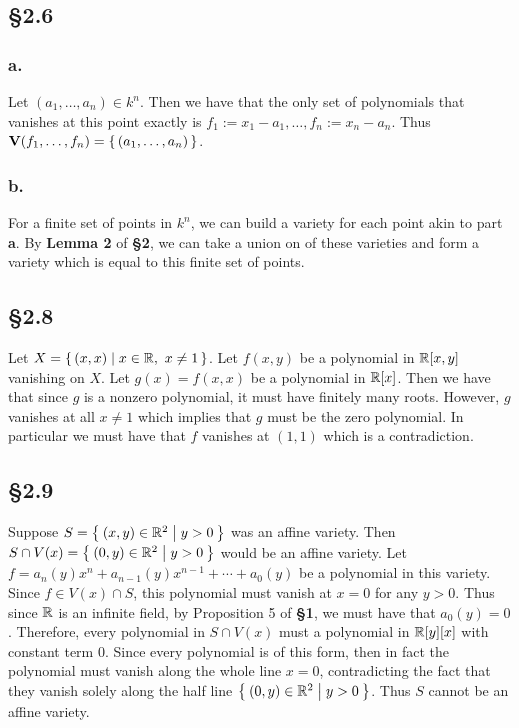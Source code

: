 \documentclass[letterpaper]{article}
\begin{document}
\subsection{\S 2.6}

\subsubsection{a.}

Let $(a_{1}, \ldots, a_{n}) \in k^{n}$. Then we have that the only set of polynomials that vanishes at this point exactly is $f_{1} := x_{1} - a_{1}, \ldots, f_{n} := x_{n} - a_{n}$. Thus $\textbf{V}(f_{1}, \ldots, f_{n}) = \set{(a_{1}, \ldots, a_{n})}$.

\subsubsection{b.}

For a finite set of points in $k^{n}$, we can build a variety for each point akin to part \textbf{a}. By \textbf{Lemma 2} of \textbf{\S 2}, we can take a union on of these varieties and form a variety which is equal to this finite set of points.

\subsection{\S 2.8}

Let $X = \set{(x, x) | x \in \mathbb{R},~ x \neq 1}$. Let $f(x, y)$ be a polynomial in $\mathbb{R}[x, y]$ vanishing on $X$. Let $g(x) = f(x, x)$ be a polynomial in $\mathbb{R}[x]$. Then we have that since $g$ is a nonzero polynomial, it must have finitely many roots. However, $g$ vanishes at all $x \neq 1$ which implies that $g$ must be the zero polynomial. In particular we must have that $f$ vanishes at $(1, 1)$ which is a contradiction.

\clearpage

\subsection{\S 2.9}

Suppose $S = \Set{(x, y) \in \mathbb{R}^{2} | y > 0}$ was an affine variety. Then $S \cap V(x) = \Set{(0, y) \in \mathbb{R}^{2} | y > 0}$ would be an affine variety. Let $f = a_{n}(y)x^{n} + a_{n - 1}(y)x^{n - 1} + \cdots + a_{0}(y)$ be a polynomial in this variety. Since $f \in V(x) \cap S$, this polynomial must vanish at $x = 0$ for any $y > 0$. Thus since $\mathbb{R}$ is an infinite field, by Proposition 5 of \textbf{\S 1}, we must have that $a_{0}(y) = 0$. Therefore, every polynomial in $S \cap V(x)$ must a polynomial in $\mathbb{R}[y][x]$ with constant term $0$. Since every polynomial is of this form, then in fact the polynomial must vanish along the whole line $x = 0$, contradicting the fact that they vanish solely along the half line $\Set{(0, y) \in \mathbb{R}^{2} | y > 0}$. Thus $S$ cannot be an affine variety.
\end{document}
